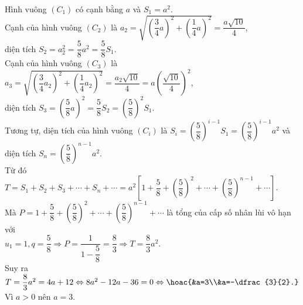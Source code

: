 \begin{ex}
\loigiai
{
Hình vuông $\left( C_1 \right)$ có cạnh bằng  $a$ và $S_1 = a^2$.\\
Cạnh của hình vuông $\left( C_2 \right)$ là $a_2 = \sqrt{\left( \dfrac{3}{4}a \right)^2 + \left( \dfrac{1}{4}a \right)^2} = \dfrac{a\sqrt{10}}{4}$, \\
diện tích $S_2 = a_2^2 = \dfrac{5}{8}a^2 = \dfrac{5}{8}S_1$.\\
Cạnh của hình vuông $\left( C_3 \right)$ là $a_3 = \sqrt{\left( \dfrac{3}{4}a_2 \right)^2 + \left( \dfrac{1}{4}a_2 \right)^2} = \dfrac{a_2\sqrt{10}}{4} = a\left(\dfrac{\sqrt{10}}{4}\right)^2$,\\
diện tích $S_3 = \left( \dfrac{5}{8}a \right)^2 = \dfrac{5}{8}S_2 = \left( \dfrac{5}{8} \right)^2 S_1$.\\
Tương tự, diện tích của hình vuông $\left( C_i \right)$ là $S_i = \left( \dfrac{5}{8} \right)^{i-1} S_1 = \left( \dfrac{5}{8} \right)^{i-1} a^2$ và \\
diện tích $S_n = \left( \dfrac{5}{8} \right)^{n-1} a^2$.\\
Từ đó $T = S_1 + S_2 + S_3 + \cdots + S_n + \cdots = a^2 \left[ 1 + \dfrac{5}{8} + \left( \dfrac{5}{8} \right)^2 + \cdots + \left( \dfrac{5}{8} \right)^{n-1} + \cdots \right]$.\\
Mà $P = 1 + \dfrac{5}{8} + \left( \dfrac{5}{8} \right)^2 + \cdots + \left( \dfrac{5}{8} \right)^{n-1} + \cdots$ là tổng của cấp số nhân lùi vô hạn với\\
$u_1 = 1, q = \dfrac{5}{8} \Rightarrow P = \dfrac{1}{1 - \dfrac{5}{8}} = \dfrac{8}{3} \Rightarrow T = \dfrac{8}{3}a^2$.\\
Suy ra $T = \dfrac{8}{3}a^2 = 4a + 12 \Leftrightarrow 8a^2 - 12a - 36 = 0 \Leftrightarrow \hoac{&a=3\\&a=-\dfrac{3}{2}.}$\\
Vì $a > 0$ nên $a = 3$.
}
\end{ex}

